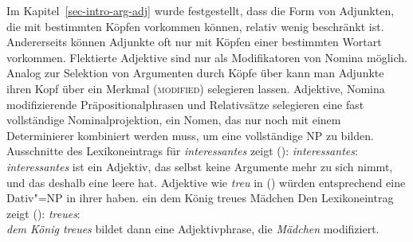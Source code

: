 Im Kapitel~\ref{sec-intro-arg-adj} wurde festgestellt, dass die Form von Adjunkten,
die mit bestimmten Köpfen vorkommen können, relativ wenig beschränkt ist. Andererseits
können Adjunkte oft nur mit Köpfen einer bestimmten Wortart vorkommen. Flektierte
Adjektive sind \zb nur als Modifikatoren von Nomina möglich. 
\eal
{}
\zl
Analog zur Selektion von Argumenten durch Köpfe über \comps kann
man Adjunkte ihren Kopf über ein Merkmal (\textsc{modified}) selegieren lassen.
Adjektive, Nomina modifizierende Präpositionalphrasen und Relativsätze
selegieren eine fast vollständige Nominalprojektion, \dash ein Nomen, das
nur noch mit einem Determinierer kombiniert werden muss, um eine vollständige
NP zu bilden. Ausschnitte des Lexikoneintrags für \emph{interessantes} zeigt ():
\ea{}
\label{le-interessantes}
\emph{interessantes}:\\
\z
\emph{interessantes} ist ein Adjektiv, das selbst keine Argumente mehr zu sich nimmt,
und das deshalb eine leere \compsl hat. Adjektive wie \emph{treu} in () würden entsprechend
eine Dativ"=NP in ihrer \compsl haben.
\ea
ein dem König treues Mädchen
\z
Den Lexikoneintrag zeigt ():
\ea
\label{le-treue}
\emph{treues}:\\
\z
\emph{dem König treues} bildet dann eine Adjektivphrase, die \emph{Mädchen} modifiziert.

